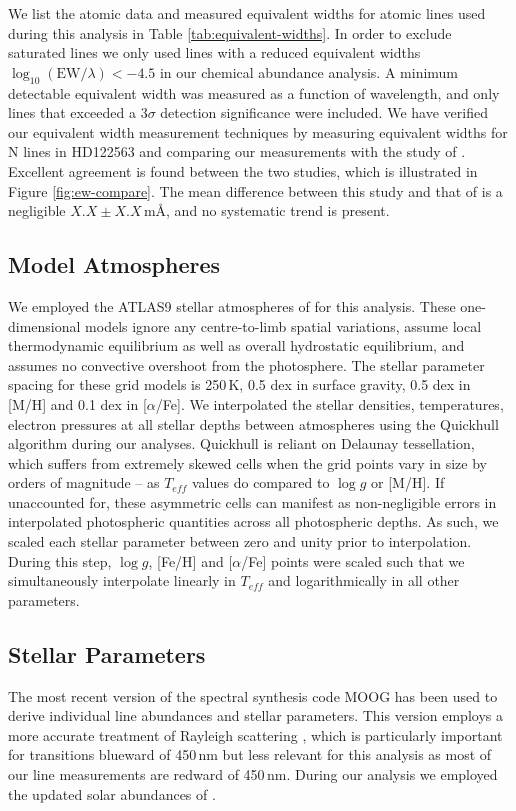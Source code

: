 \documentclass{emulateapj}
\begin{document}
We list the atomic data and measured equivalent widths for atomic lines used during this analysis in Table \ref{tab:equivalent-widths}. In order to exclude saturated lines we only used lines with a reduced equivalent widths $\log_{10}{(\mbox{EW}/\lambda)} < -4.5$ in our chemical abundance analysis. A minimum detectable equivalent width was measured as a function of wavelength, and only lines that exceeded a $3\sigma$ detection significance were included. We have verified our equivalent width measurement techniques by measuring equivalent widths for N lines in HD122563 and comparing our measurements with the study of \citet{Norris;et-al_2000}. Excellent agreement is found between the two studies, which is illustrated in Figure \ref{fig:ew-compare}. The mean difference between this study and that of \cite{Norris;et-al_2000} is a negligible $X.X \pm X.X$\,m\AA{}, and no systematic trend is present.


\subsection{Model Atmospheres}
We employed the ATLAS9 stellar atmospheres of \citet{Castelli;Kurucz_2003} for this analysis. These one-dimensional models ignore any centre-to-limb spatial variations, assume local thermodynamic equilibrium as well as overall hydrostatic equilibrium, and assumes no convective overshoot from the photosphere. The stellar parameter spacing for these grid models is 250\,K, 0.5 dex in surface gravity, 0.5 dex in [M/H] and 0.1 dex in [$\alpha$/Fe]. We interpolated the stellar densities, temperatures, electron pressures at all stellar depths between atmospheres using the Quickhull algorithm during our analyses. Quickhull is reliant on Delaunay tessellation, which suffers from extremely skewed cells when the grid points vary in size by orders of magnitude -- as $T_{eff}$ values do compared to $\log{g}$ or [M/H]. If unaccounted for, these asymmetric cells can manifest as non-negligible errors in interpolated photospheric quantities across all photospheric depths. As such, we scaled each stellar parameter between zero and unity prior to interpolation. During this step, $\log{g}$, [Fe/H] and [$\alpha$/Fe] points were scaled such that we simultaneously interpolate linearly in $T_{eff}$ and logarithmically in all other parameters.

\subsection{Stellar Parameters}
The most recent version of the spectral synthesis code MOOG \citep{Sneden;et-al_1973} has been used to derive individual line abundances and stellar parameters. This version employs a more accurate treatment of Rayleigh scattering \citet{Sobeck;et-al_2011}, which is particularly important for transitions blueward of 450\,nm but less relevant for this analysis as most of our line measurements are redward of 450\,nm. During our analysis we employed the updated solar abundances of \citet{Asplund;et-al_2009}.
\end{document}
